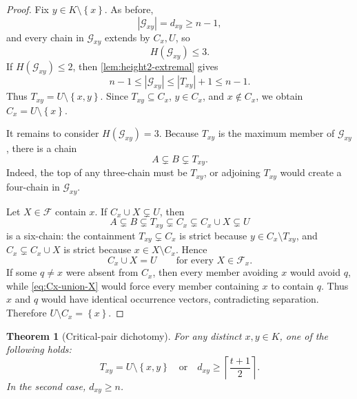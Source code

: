 \documentclass[11pt,reqno]{amsart}
\numberwithin{equation}{section}
\newtheorem{theorem}{Theorem}[section]
\theoremstyle{definition}
\theoremstyle{remark}
\newcommand{\F}{\mathcal{F}}
\newcommand{\G}{\mathcal{G}}
\newcommand{\1}{\mathbf{1}}
\newcommand{\set}[1]{\left\{#1\right\}}
\newcommand{\abs}[1]{\left|#1\right|}
\begin{document}
\begin{proof}
Fix \(y\in K\setminus\set{x}\).  As before,
\[
\abs{\G_{xy}}=d_{xy}\ge n-1,
\]
and every chain in \(\G_{xy}\) extends by \(C_x,U\), so
\begin{equation}\label{eq:Gxy-height3}
H(\G_{xy})\le3.
\end{equation}
If \(H(\G_{xy})\le2\), then \cref{lem:height2-extremal} gives
\[
n-1\le \abs{\G_{xy}}
\le \abs{T_{xy}}+1
\le n-1.
\]
Thus \(T_{xy}=U\setminus\set{x,y}\).  Since \(T_{xy}\subseteq C_x\), \(y\in C_x\), and \(x\notin C_x\), we obtain \(C_x=U\setminus\set{x}\).

It remains to consider \(H(\G_{xy})=3\).  Because \(T_{xy}\) is the maximum member of \(\G_{xy}\), there is a chain
\begin{equation}\label{eq:ABT}
A\subsetneq B\subsetneq T_{xy}.
\end{equation}
Indeed, the top of any three-chain must be \(T_{xy}\), or adjoining \(T_{xy}\) would create a four-chain in \(\G_{xy}\).

Let \(X\in\F\) contain \(x\).  If \(C_x\cup X\subsetneq U\), then
\[
A\subsetneq B\subsetneq T_{xy}
\subsetneq C_x
\subsetneq C_x\cup X
\subsetneq U
\]
is a six-chain: the containment \(T_{xy}\subsetneq C_x\) is strict because \(y\in C_x\setminus T_{xy}\), and \(C_x\subsetneq C_x\cup X\) is strict because \(x\in X\setminus C_x\).  Hence
\begin{equation}\label{eq:Cx-union-X}
C_x\cup X=U
\qquad\text{for every }X\in\F_x.
\end{equation}
If some \(q\ne x\) were absent from \(C_x\), then every member avoiding \(x\) would avoid \(q\), while \cref{eq:Cx-union-X} would force every member containing \(x\) to contain \(q\).  Thus \(x\) and \(q\) would have identical occurrence vectors, contradicting separation.  Therefore \(U\setminus C_x=\set{x}\).
\end{proof}

\begin{theorem}[Critical-pair dichotomy]\label{thm:pair-dichotomy}
For any distinct \(x,y\in K\), one of the following holds:
\begin{equation}\label{eq:dichotomy}
\boxed{
T_{xy}=U\setminus\set{x,y}
\quad\text{or}\quad
 d_{xy}\ge\left\lceil\frac{t+1}{2}\right\rceil.}
\end{equation}
In the second case, \(d_{xy}\ge n\).
\end{theorem}
\end{document}
